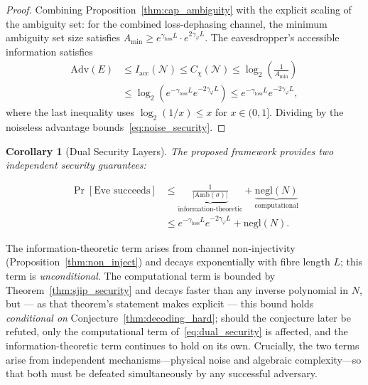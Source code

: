 \documentclass[journal,twocolumn]{IEEEtran}
\theoremstyle{definition}
\theoremstyle{plain}
\newtheorem{corollary}[theorem]{Corollary}
\newcommand{\Amb}{\mathrm{Amb}}
\begin{document}
\begin{proof}
Combining Proposition~\ref{thm:cap_ambiguity} with the explicit scaling
of the ambiguity set: for the combined loss-dephasing channel, the
minimum ambiguity set size satisfies $A_{\min} \ge
e^{\gamma_{\mathrm{loss}}L} \cdot e^{2\gamma_\varphi L}$.
The eavesdropper's accessible information satisfies
\begin{align}
  \mathrm{Adv}(E) &\le I_{\mathrm{acc}}(\mathcal{N})
  \le C_\chi(\mathcal{N})
  \le \log_2\!\left(\frac{1}{A_{\min}}\right) \nonumber\\
  &\le \log_2\!\left(e^{-\gamma_{\mathrm{loss}}L}
    e^{-2\gamma_\varphi L}\right)
  \le e^{-\gamma_{\mathrm{loss}}L} e^{-2\gamma_\varphi L},
  \label{eq:noise_adv_proof}
\end{align}
where the last inequality uses $\log_2(1/x) \le x$ for
$x \in (0,1]$.  Dividing by the noiseless advantage
bounds~\eqref{eq:noise_security}.
\end{proof}

\begin{corollary}[Dual Security Layers]
\label{cor:dual_security}
The proposed framework provides two independent security guarantees:

\begin{equation}
\begin{split}
  \Pr[\text{Eve succeeds}] &\le
  \underbrace{\frac{1}{|\Amb(\sigma)|}}_{\text{information-theoretic}}
  + \underbrace{\mathrm{negl}(N)}_{\text{computational}}
  \\&\le e^{-\gamma_{\mathrm{loss}}L} e^{-2\gamma_\varphi L}
  + \mathrm{negl}(N).
  \label{eq:dual_security}
\end{split}
\end{equation}
\end{corollary}

The information-theoretic term arises from channel non-injectivity
(Proposition~\ref{thm:non_inject}) and decays exponentially with fibre
length $L$; this term is \emph{unconditional}. The computational term
is bounded by Theorem~\ref{thm:sjip_security} and decays faster than
any inverse polynomial in $N$, but --- as that theorem's statement
makes explicit --- this bound holds \emph{conditional on}
Conjecture~\ref{thm:decoding_hard}; should the conjecture later be
refuted, only the computational term of~\eqref{eq:dual_security} is
affected, and the information-theoretic term continues to hold on
its own. Crucially, the two terms arise from independent
mechanisms---physical noise and algebraic complexity---so that both
must be defeated simultaneously by any successful adversary.
\end{document}
